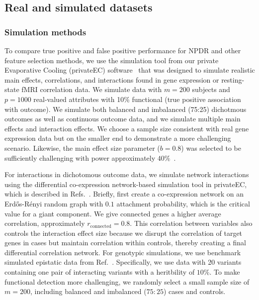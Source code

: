 \documentclass{bioinfo}
\begin{document}
\subsection{Real and simulated datasets}
\subsubsection{Simulation methods}
To compare true positive and false positive performance for NPDR and other feature selection methods, we use the simulation tool from our private Evaporative Cooling (privateEC) software~\citep{le17} that was designed to simulate realistic main effects, correlations, and interactions found in gene expression or resting-state fMRI correlation data.
We simulate data with $m=200$ subjects and $p=1000$ real-valued attributes with 10\% functional (true positive association with outcome).
We simulate both balanced and imbalanced (75:25) dichotmous outcomes as well as continuous outcome data, and we simulate multiple main effects and interaction effects. 
We choose a sample size consistent with real gene expression data but on the smaller end to demonstrate a more challenging scenario.
Likewise, the main effect size parameter ($b=0.8$) was selected to be sufficiently challenging with power approximately $40\%$~\citep{le17}.

For interactions in dichotomous outcome data, we simulate network interactions using the differential co-expression network-based simulation tool in privateEC, which is described in Refs.~\citep{le17, lareau15}.
Briefly, first create a co-expression network on an Erd\H{o}s-R\'enyi random graph with $0.1$ attachment probability, which is the critical value for a giant component.
We give connected genes a higher average correlation, approximately $r_{\text{connected}}=0.8$.%
This correlation between variables also controls the interaction effect size because we disrupt the correlation of target genes in cases but maintain correlation within controls, thereby creating a final differential correlation network.
For genotypic simulations, we use benchmark simulated epistatic data from Ref.~\citep{urbanowicz17}. Specifically, we use data with 20 variants containing one pair of interacting variants with a heritbility of $10\%$. To make functional detection more challenging, we randomly select a small sample size of $m=200$, including balanced and imbalanced ($75:25$) cases and controls.
\end{document}
